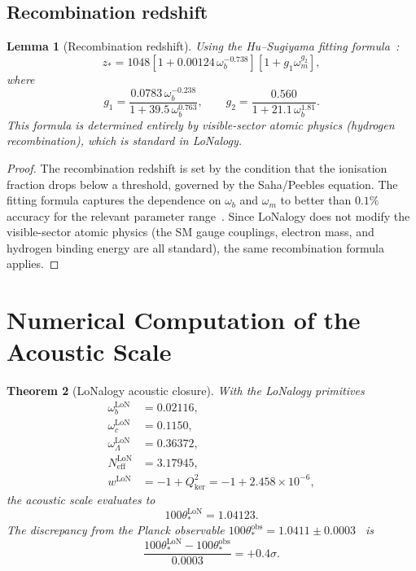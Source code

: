 \documentclass[12pt]{article}
\theoremstyle{plain}
\newtheorem{theorem}{Theorem}[section]
\newtheorem{lemma}[theorem]{Lemma}
\theoremstyle{definition}
\numberwithin{equation}{section}
\newcommand{\kker}{\mathrm{ker}}
\newcommand{\eff}{\mathrm{eff}}
\newcommand{\obs}{\mathrm{obs}}
\newcommand{\LoN}{\mathrm{LoN}}
\begin{document}
\subsection{Recombination redshift}

\begin{lemma}[Recombination redshift]\label{lem:zstar}
Using the Hu--Sugiyama fitting formula~\cite{HuSugiyama1996}:
\begin{equation}
z_* = 1048\left[1+0.00124\,\omega_b^{-0.738}\right]\left[1+g_1\omega_m^{g_2}\right],
\end{equation}
where
\begin{equation}
g_1 = \frac{0.0783\,\omega_b^{-0.238}}{1+39.5\,\omega_b^{0.763}},
\qquad
g_2 = \frac{0.560}{1+21.1\,\omega_b^{1.81}}.
\end{equation}
This formula is determined entirely by visible-sector atomic physics
(hydrogen recombination), which is standard in LoNalogy.
\end{lemma}

\begin{proof}
The recombination redshift is set by the condition that the ionisation
fraction drops below a threshold, governed by the Saha/Peebles equation.
The fitting formula captures the dependence on $\omega_b$ and $\omega_m$
to better than $0.1\%$ accuracy for the relevant parameter
range~\cite{HuSugiyama1996}.
Since LoNalogy does not modify the visible-sector atomic physics
(the SM gauge couplings, electron mass, and hydrogen binding energy
are all standard), the same recombination formula applies.
\end{proof}


\section{Numerical Computation of the Acoustic Scale}\label{sec:numerical}

\begin{theorem}[LoNalogy acoustic closure]\label{thm:thetastar}
With the LoNalogy primitives
\begin{align}
\omega_b^{\LoN} &= 0.02116,\\
\omega_c^{\LoN} &= 0.1150,\\
\omega_\Lambda^{\LoN} &= 0.36372,\\
N_{\eff}^{\LoN} &= 3.17945,\\
w^{\LoN} &= -1+Q_{\kker}^2 = -1+2.458\times10^{-6},
\end{align}
the acoustic scale evaluates to
\begin{equation}
\boxed{100\theta_*^{\LoN} = 1.04123.}
\end{equation}
The discrepancy from the Planck observable
$100\theta_*^{\obs}=1.0411\pm0.0003$~\cite{Planck2018} is
\begin{equation}
\frac{100\theta_*^{\LoN}-100\theta_*^{\obs}}{0.0003} = +0.4\sigma.
\end{equation}
\end{theorem}
\end{document}
